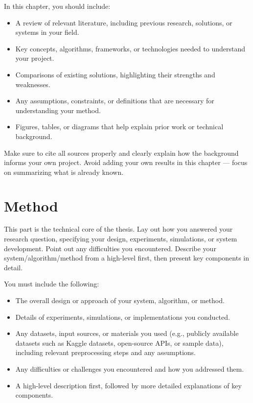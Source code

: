 \documentclass[12pt]{report}
\begin{document}
In this chapter, you should include:

\begin{itemize}
    \item A review of relevant literature, including previous research, solutions, or systems in your field.
    \item Key concepts, algorithms, frameworks, or technologies needed to understand your project.
    \item Comparisons of existing solutions, highlighting their strengths and weaknesses.
    \item Any assumptions, constraints, or definitions that are necessary for understanding your method.
    \item Figures, tables, or diagrams that help explain prior work or technical background.
\end{itemize}

Make sure to cite all sources properly and clearly explain how the background informs your own project. Avoid adding your own results in this chapter — focus on summarizing what is already known.

 



\chapter{Method}

This part is the technical core of the thesis. Lay out how you answered your research question, specifying your design, experiments, simulations, or system development. Point out any difficulties you encountered. Describe your system/algorithm/method from a high-level first, then present key components in detail.

You must include the following:

\begin{itemize}
    \item The overall design or approach of your system, algorithm, or method.
    \item Details of experiments, simulations, or implementations you conducted.
    \item Any datasets, input sources, or materials you used (e.g., publicly available datasets such as Kaggle datasets, open-source APIs, or sample data), including relevant preprocessing steps and any assumptions.
    \item Any difficulties or challenges you encountered and how you addressed them.
    \item A high-level description first, followed by more detailed explanations of key components.
\end{itemize}
\end{document}
